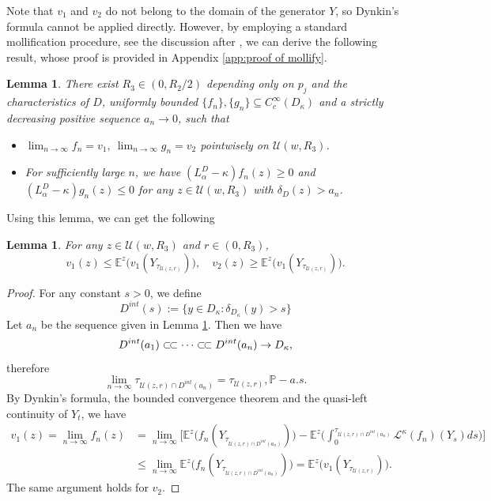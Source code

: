 \documentclass[12pt,a4paper]{amsart}
\numberwithin{equation}{section}
\theoremstyle{plain}
\newcommand{\mc}{\mathcal}
\newcommand{\mb}{\mathbb}
\newcommand{\1}{\mathbbm{1}}
\newtheorem{lemma}[theorem]{Lemma}
\begin{document}
Note that $v_1$ and $v_2$ do not belong to the domain 
of the generator $Y$, 
so Dynkin's formula cannot be applied directly. However, by employing a standard mollification procedure, see the discussion after \cite[Lemma 3.1]{CKSV20}, we can derive the following result, whose proof is provided in Appendix \ref{app:proof of mollify}.
\begin{lemma}\label{mollify: codim 1}
There exist $R_3 \in (0,R_2/2)$ depending only on $p_j$ and the characteristics of $D$, uniformly bounded $\{f_n\}, \{g_n\}\subseteq 
C_c^{\infty}(D_\kappa)$
and a strictly decreasing positive sequence $a_n \to 0$, such that 
\begin{itemize}
\item $\lim_{n\to \infty}f_n = v_1,\ \lim_{n\to \infty}g_n = v_2$ pointwisely on 
$\mc U(w,R_3)$.
\item For sufficiently large $n$, 
we have $(L^D_\alpha-\kappa)f_n(z)\ge 0$ and $(L^D_\alpha-\kappa)g_n(z)\le 0$ for any $z \in \mc U(w,R_3)$ with $\delta_D(z)>a_n$.
\end{itemize}
\end{lemma}
Using this lemma, we can get the following

\begin{lemma}\label{lemma:sub-super-harmonic}
    For any $z \in \mc U(w, R_3)$ and $r \in (0, R_3)$,
    \begin{equation}\label{ineqn:sub-super-harmonic}
       v_1(z) \le \mb E^z\big(v_1(Y_{\tau_{\mc U(z,r)}})\big),\quad v_2(z) \ge \mb E^z\big(v_1(Y_{\tau_{\mc U(z,r)}})\big).
    \end{equation}
\end{lemma}
\begin{proof}
 For any constant $s>0$, we define 
\begin{equation} \label{interior set}
D^{int}(s):= \{y\in D_\kappa: \delta_{D_\kappa}(y)>s\}
\end{equation}
Let $a_n$ be the sequence given in Lemma \ref{mollify: codim 1}.
Then we have 
$$
D^{int}(a_1) \subset\joinrel\subset \cdots \subset\joinrel\subset D^{int}(a_n) 
\to D_\kappa, 
$$
therefore
\begin{equation}
\lim_{n \to \infty}\tau_{\mc U(z,r) \cap D^{int}(a_n)} = \tau_{\mc U(z,r)}, \mb P - a.s.
\end{equation}
By Dynkin's formula, the bounded convergence theorem and the quasi-left continuity of $Y_t$, 
we have 
\begin{align*}
v_1(z) = \lim_{n\to \infty}f_n(z) & = \lim_{n\to \infty} \bigg[ \mb E^z\big(f_n(Y_{\tau_{\mc U(z,r) \cap D^{int}(a_n)}})\big) - \mb E^z\bigg(\int_0^{\tau_{\mc U(z,r) \cap D^{int}(a_n)}} \mc L^{\kappa}(f_n)(Y_s)ds \bigg) \bigg]\\
& \le \lim_{n\to \infty}\mb E^z\big(f_n(Y_{\tau_{\mc U(z,r) \cap D^{int}(a_n)}})\big) = \mb E^z\big(v_1(Y_{\tau_{\mc U(z,r)}})\big).
\end{align*}
The same argument holds for $v_2$. 
\end{proof}
\end{document}
